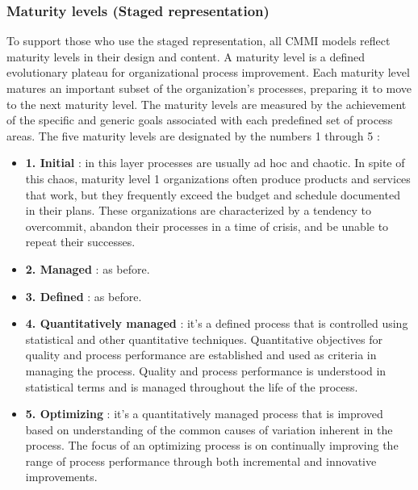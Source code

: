 \subsubsection{Maturity levels (Staged representation)}
To support those who use the staged representation, all CMMI models reflect maturity levels in their design and content. A maturity level is a defined evolutionary plateau for organizational process improvement. Each maturity level matures an important subset of the organization's processes, preparing it to move to the next maturity level. The maturity levels are measured by the achievement of the specific and generic goals associated with each predefined set of process areas. The five maturity levels are designated by the numbers 1 through 5 :
\begin{itemize}
    \item \textbf{1. Initial} : in this layer processes are usually ad hoc and chaotic. In spite of this chaos, maturity level 1 organizations often produce products and services that work, but they frequently exceed the budget and schedule documented in their plans. These organizations are characterized by a tendency to overcommit, abandon their processes in a time of crisis, and be unable to repeat their successes.
    \item \textbf{2. Managed} : as before.
    \item \textbf{3. Defined} : as before.
    \item \textbf{4. Quantitatively managed} : it's a defined process that is controlled using statistical and other quantitative techniques. Quantitative objectives for quality and process performance are established and used as criteria in managing the process. Quality and process performance is understood in statistical terms and is managed throughout the life of the process.
    \item \textbf{5. Optimizing} : it's a quantitatively managed process that is improved based on understanding of the common causes of variation inherent in the process. The focus of an optimizing process is on continually improving the range of process performance through both incremental and innovative improvements.
\end{itemize}
